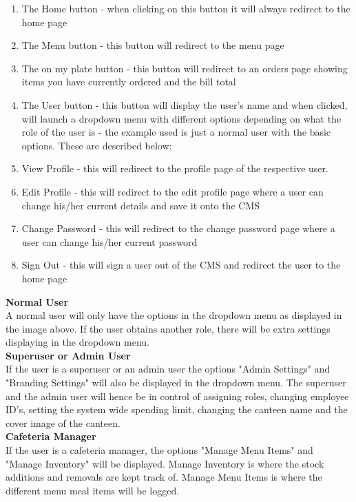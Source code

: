 \documentclass[a4paper,12pt]{article}
\begin{document}
\begin{enumerate}
\item The Home button - when clicking on this button it will always redirect to the home page
\item The Menu button - this button will redirect to the menu page
\item The on my plate button - this button will redirect to an orders page showing items you have currently ordered and the bill total
\item The User button - this button will display the user's name and when clicked, will launch a dropdown menu with different options depending on what the role of the user is - the example used is just a normal user with the basic options. These are described below:
\item View Profile - this will redirect to the profile page of the respective user.
\item Edit Profile - this will redirect to the edit profile page where a user can change his/her current details and save it onto the CMS
\item Change Password - this will redirect to the change password page where a user can change his/her current password
\item Sign Out  - this will sign a user out of the CMS and redirect the user to the home page
\end{enumerate}

\textbf{Normal User}\\
A normal user will only have the options in the dropdown menu as displayed in the image above. If the user obtains another role, there will be extra settings displaying in the dropdown menu.\\

\textbf{Superuser or Admin User}\\
If the user is a superuser or an admin user the options "Admin Settings" and "Branding Settings" will also be displayed in the dropdown menu. The superuser and the admin user will hence be in control of assigning roles, changing employee ID's, setting the system wide spending limit, changing the canteen name and the cover image of the canteen.  \\

\textbf{Cafeteria Manager}\\
If the user is a cafeteria manager, the options "Manage Menu Items" and "Manage Inventory" will be displayed. Manage Inventory is where the stock additions and removals are kept track of. Manage Menu Items  is where the different menu meal items will be logged.\\
\end{document}
